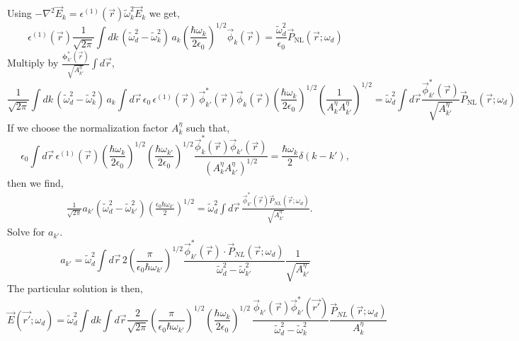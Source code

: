 \documentclass[12pt]{article}
\begin{document}
Using $-\nabla^2 \vec{E}_k = \epsilon^{(1)}(\vec{r}) \tilde{\omega}_k^2 \vec{E}_k$ we get,
\begin{equation*}
\epsilon^{(1)}(\vec{r}) \frac{1}{\sqrt{2\pi}} \int dk\, (\tilde{\omega}_d^2 - \tilde{\omega}_k^2)\, a_k \left( \frac{\hbar \omega_k}{2\epsilon_0} \right)^{1/2} \vec{\phi}_k(\vec{r}) = \frac{\tilde{\omega}_d^2}{\epsilon_0} \vec{P}_{\mathrm{NL}}(\vec{r}; \omega_d)
\end{equation*}
Multiply by $\frac{\bm{\phi}^*_{k'}(\vec{r})}{\sqrt{A_{k'}^\eta}} \int d\vec{r}$,
\begin{equation*}
\frac{1}{\sqrt{2\pi}} \int dk\, (\tilde{\omega}_d^2 - \tilde{\omega}_k^2)\, a_k \int d\vec{r}\, \epsilon_0\, \epsilon^{(1)}(\vec{r})\, \vec{\phi}^*_{k'}(\vec{r}) \vec{\phi}_k(\vec{r}) \left( \frac{\hbar \omega_k}{2 \epsilon_0} \right)^{1/2} \left( \frac{1}{A_k^\eta A_{k'}^\eta} \right)^{1/2} = \tilde{\omega}_d^2 \int d\vec{r} \frac{\vec{\phi}^*_{k'}(\vec{r})}{\sqrt{A_{k'}^\eta}} \vec{P}_{\mathrm{NL}}(\vec{r}; \omega_d)
\end{equation*}
If we choose the normalization factor $A_k^\eta$ such that,
\begin{equation*}
\epsilon_0 \int d\vec{r}\, \epsilon^{(1)}(\vec{r}) \left( \frac{\hbar \omega_k}{2 \epsilon_0} \right)^{1/2} \left( \frac{\hbar \omega_{k'}}{2 \epsilon_0} \right)^{1/2} \frac{ \vec{\phi}^*_k(\vec{r}) \vec{\phi}_{k'}(\vec{r}) }{ \left( A_k^\eta A_{k'}^\eta \right)^{1/2} } = \frac{\hbar \omega_k}{2} \delta(k - k'),
\end{equation*}
then we find,
\begin{align*}
&\frac{1}{\sqrt{2\pi}} a_{k'} (\tilde{\omega}_d^2 - \tilde{\omega}_{k'}^2) \left( \frac{\epsilon_0 \hbar \omega_{k'}}{2} \right)^{1/2} = \tilde{\omega}_d^2 \int d\vec{r} \, \frac{\vec{\phi}_{k'}^*(\vec{r}) \vec{P}_{NL}(\vec{r}; \omega_d)}{\sqrt{A_{k'}^\eta}}.
\end{align*}
Solve for $a_{k'}$.
\begin{equation*}
 a_{k'} = \tilde{\omega}_d^2 \int d\vec{r} \, 2\left( \frac{\pi}{\epsilon_0 \hbar \omega_{k'}} \right)^{1/2} \frac{\vec{\phi}_{k'}^*(\vec{r}) \cdot \vec{P}_{NL}(\vec{r}; \omega_d)}{\tilde{\omega}_d^2 - \tilde{\omega}_{k'}^2} \frac{1}{\sqrt{A_{k'}^\eta}}
\end{equation*}
The particular solution is then,
\begin{equation*}
\vec{E}(\vec{r'}; \omega_d) = \tilde{\omega}_d^2 \int dk \int d\vec{r}  \frac{2}{\sqrt{2\pi}} \left(\frac{\pi}{\epsilon_0\hbar\omega_{k'}}\right)^{1/2}\left(\frac{\hbar\omega_k}{2\epsilon_0}\right)^{1/2}  \, \frac{\vec{\phi}_{k'}(\vec{r}) \vec{\phi}_{k'}^*(\vec{r'})}{\tilde{\omega}_d^2 - \tilde{\omega}_k^2} \frac{\vec{P}_{NL}(\vec{r}; \omega_d)}{A_k^\eta}
\end{equation*}
\end{document}
